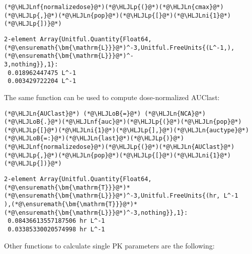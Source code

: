 \documentclass[12pt,a4paper]{article}
\newcommand{\HLJLn}[1]{#1}
\newcommand{\HLJLnf}[1]{\textcolor[RGB]{66,102,213}{#1}}
\newcommand{\HLJLni}[1]{\textcolor[RGB]{59,151,46}{#1}}
\newcommand{\HLJLoB}[1]{\textcolor[RGB]{102,102,102}{\textbf{#1}}}
\newcommand{\HLJLp}[1]{#1}
\begin{document}
\begin{lstlisting}
(*@\HLJLnf{normalizedose}@*)(*@\HLJLp{(}@*)(*@\HLJLn{cmax}@*)(*@\HLJLp{,}@*)(*@\HLJLn{pop}@*)(*@\HLJLp{[}@*)(*@\HLJLni{1}@*)(*@\HLJLp{])}@*)
\end{lstlisting}

\begin{lstlisting}
2-element Array{Unitful.Quantity{Float64,(*@\ensuremath{\bm{\mathrm{L}}}@*)^-3,Unitful.FreeUnits{(L^-1,),(*@\ensuremath{\bm{\mathrm{L}}}@*)^-
3,nothing}},1}:
 0.018962447475 L^-1
 0.003429722204 L^-1
\end{lstlisting}


The same function can be used to compute dose-normalized AUClast:


\begin{lstlisting}
(*@\HLJLn{AUClast}@*) (*@\HLJLoB{=}@*) (*@\HLJLn{NCA}@*)(*@\HLJLoB{.}@*)(*@\HLJLnf{auc}@*)(*@\HLJLp{(}@*)(*@\HLJLn{pop}@*)(*@\HLJLp{[}@*)(*@\HLJLni{1}@*)(*@\HLJLp{],}@*)(*@\HLJLn{auctype}@*)(*@\HLJLoB{=:}@*)(*@\HLJLn{last}@*)(*@\HLJLp{)}@*)
(*@\HLJLnf{normalizedose}@*)(*@\HLJLp{(}@*)(*@\HLJLn{AUClast}@*)(*@\HLJLp{,}@*)(*@\HLJLn{pop}@*)(*@\HLJLp{[}@*)(*@\HLJLni{1}@*)(*@\HLJLp{])}@*)
\end{lstlisting}

\begin{lstlisting}
2-element Array{Unitful.Quantity{Float64,(*@\ensuremath{\bm{\mathrm{T}}}@*)*(*@\ensuremath{\bm{\mathrm{L}}}@*)^-3,Unitful.FreeUnits{(hr, L^-1
),(*@\ensuremath{\bm{\mathrm{T}}}@*)*(*@\ensuremath{\bm{\mathrm{L}}}@*)^-3,nothing}},1}:
 0.08436613557187506 hr L^-1
 0.03385330020574998 hr L^-1
\end{lstlisting}


Other functions to calculate single PK parameters are the following:
\end{document}
